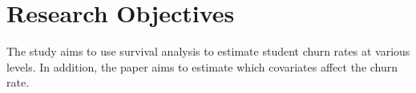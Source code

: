 \documentclass[doublespacing]{report} [12px]%
\begin{document}
\section{Research Objectives}

The study aims to use survival analysis to estimate student churn rates at various levels. In addition, the paper aims to estimate which covariates affect the churn rate.
%	

\end{document}
